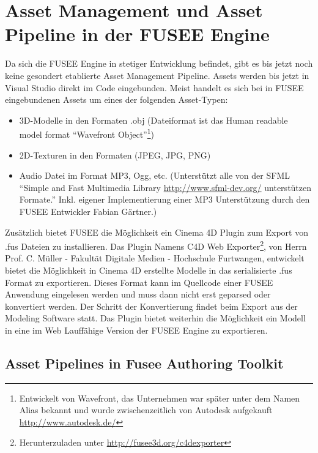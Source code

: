 \documentclass[pagesize, paper=a4, fontsize=12pt,titlepage=true, headings=small, headnosepline, abstractoff, liststotoc, nochapterprefix, plainheadsepline, twoside]{scrreprt}
\begin{document}
\section{Asset Management und Asset Pipeline in der FUSEE Engine}
Da sich die FUSEE Engine in stetiger Entwicklung befindet, gibt es bis jetzt noch keine gesondert etablierte Asset Management Pipeline. Assets werden bis jetzt in Visual Studio direkt im Code eingebunden. Meist handelt es sich bei in FUSEE eingebundenen Assets um eines der folgenden Asset-Typen:
\begin{itemize}
\item 3D-Modelle in den Formaten .obj (Dateiformat ist das Human readable model format “Wavefront Object”\footnote{Entwickelt von Wavefront, das Unternehmen war später unter dem Namen Alias bekannt und wurde zwischenzeitlich von Autodesk aufgekauft \url{http://www.autodesk.de/}})
\item 2D-Texturen in den Formaten (JPEG, JPG, PNG)
\item Audio Datei im Format MP3, Ogg, etc. (Unterstützt alle von der SFML “Simple and Fast Multimedia Library \url{http://www.sfml-dev.org/} unterstützen Formate.” Inkl. eigener Implementierung einer MP3 Unterstützung durch den FUSEE Entwickler Fabian Gärtner.)
\end{itemize}

Zusätzlich bietet FUSEE die Möglichkeit ein Cinema 4D Plugin zum Export von .fus Dateien zu installieren. Das Plugin Namens C4D Web Exporter\footnote{Herunterzuladen unter \url{http://fusee3d.org/c4dexporter}}, von Herrn Prof. C. Müller - Fakultät Digitale Medien - Hochschule Furtwangen, entwickelt bietet die Möglichkeit in Cinema 4D erstellte Modelle in das serialisierte .fus Format zu exportieren. Dieses Format kann im Quellcode einer FUSEE Anwendung eingelesen werden und muss dann nicht erst geparsed oder konvertiert werden. Der Schritt der Konvertierung findet beim Export aus der Modeling Software statt. Das Plugin bietet weiterhin die Möglichkeit ein Modell in eine im Web Lauffähige Version der FUSEE Engine zu exportieren.

\subsection{Asset Pipelines in Fusee Authoring Toolkit}
\end{document}
